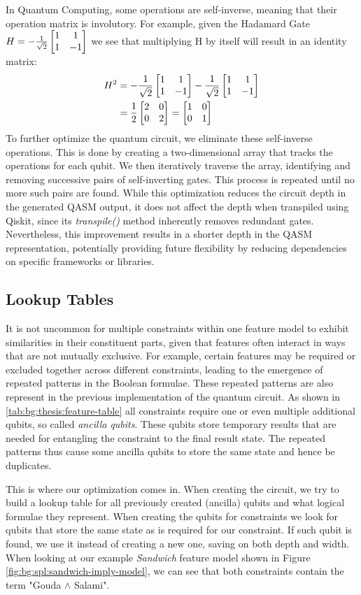 In Quantum Computing, some operations are self-inverse, meaning that their operation matrix is involutory. For example, given the Hadamard Gate $H =-\frac{1}{\sqrt{2}}\begin{bmatrix}1&1\\1&-1\end{bmatrix}$ we see that multiplying H by itself will result in an identity matrix:
\begin{align}
    H^2 &= -\frac{1}{\sqrt{2}}\begin{bmatrix}1&1\\1&-1\end{bmatrix} -\frac{1}{\sqrt{2}}\begin{bmatrix}1&1\\1&-1\end{bmatrix} \nonumber\\
    &= \frac{1}{2}\begin{bmatrix}2&0\\0&2\end{bmatrix} = \begin{bmatrix}1&0\\0&1\end{bmatrix}\
\end{align}
To further optimize the quantum circuit, we eliminate these self-inverse operations. 
This is done by creating a two-dimensional array that tracks the operations for each qubit. 
We then iteratively traverse the array, identifying and removing successive pairs of self-inverting gates. 
This process is repeated until no more such pairs are found. 
While this optimization reduces the circuit depth in the generated QASM output, it does not affect the depth when transpiled using Qiskit, since its \textit{transpile()} method inherently removes redundant gates. 
Nevertheless, this improvement results in a shorter depth in the QASM representation, potentially providing future flexibility by reducing dependencies on specific frameworks or libraries.

\subsection{Lookup Tables}
\label{sec:impl:lookup-tables}
It is not uncommon for multiple constraints within one feature model to exhibit similarities in their constituent parts, given that features often interact in ways that are not mutually exclusive.
For example, certain features may be required or excluded together across different constraints, leading to the emergence of repeated patterns in the Boolean formulae.
These repeated patterns are also represent in the previous implementation of the quantum circuit.
As shown in \autoref{tab:bg:thesis:feature-table} all constraints require one or even multiple additional qubits, so called \textit{ancilla qubits}. 
These qubits store temporary results that are needed for entangling the constraint to the final result state.
The repeated patterns thus cause some ancilla qubits to store the same state and hence be duplicates.

This is where our optimization comes in. When creating the circuit, we try to build a lookup table for all previously created (ancilla) qubits and what logical formulae they represent. 
When creating the qubits for constraints we look for qubits that store the same state as is required for our constraint.
If such qubit is found, we use it instead of creating a new one, saving on both depth and width.
When looking at our example \textit{Sandwich} feature model shown in Figure \ref{fig:bg:spl:sandwich-imply-model}, we can see that both constraints contain the term "Gouda $\land$ Salami".

